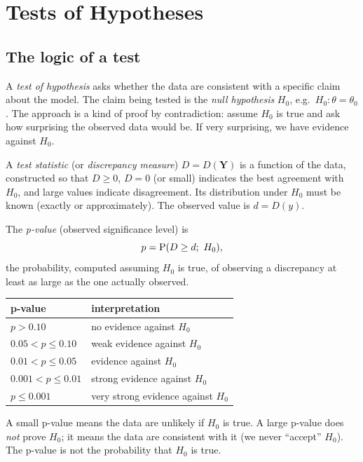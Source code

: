 \chapter{Tests of Hypotheses}

\section{The logic of a test}

A \emph{test of hypothesis} asks whether the data are consistent with a specific claim
about the model. The claim being tested is the \emph{null hypothesis} $H_0$, e.g.\
$H_0:\theta=\theta_0$. The approach is a kind of proof by contradiction: assume $H_0$ is
true and ask how surprising the observed data would be. If very surprising, we have
evidence against $H_0$.

\begin{definition}
A \emph{test statistic} (or \emph{discrepancy measure}) $D = D(\mathbf Y)$ is a
function of the data, constructed so that $D\ge 0$, $D=0$ (or small) indicates the best
agreement with $H_0$, and large values indicate disagreement. Its distribution under $H_0$
must be known (exactly or approximately). The observed value is $d = D(y)$.
\end{definition}

\begin{definition}[p-value]
The \emph{p-value} (observed significance level) is
\[
p = \operatorname{P}(D\ge d;\ H_0),
\]
the probability, computed assuming $H_0$ is true, of observing a discrepancy at least as
large as the one actually observed.
\end{definition}

\begin{important}
\begin{center}
\begin{tabular}{ll}
\toprule
p-value & interpretation \\
\midrule
$p > 0.10$ & no evidence against $H_0$ \\
$0.05 < p\le 0.10$ & weak evidence against $H_0$ \\
$0.01 < p\le 0.05$ & evidence against $H_0$ \\
$0.001 < p\le 0.01$ & strong evidence against $H_0$\\
$p\le 0.001$ & very strong evidence against $H_0$\\
\bottomrule
\end{tabular}
\end{center}
A small p-value means the data are unlikely if $H_0$ is true. A large p-value does
\emph{not} prove $H_0$; it means the data are consistent with it (we never ``accept''
$H_0$). The p-value is not the probability that $H_0$ is true.
\end{important}

